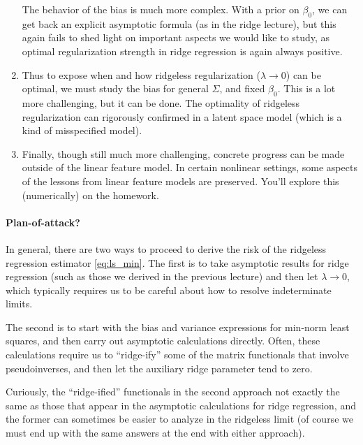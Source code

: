 \documentclass{article}
\begin{document}
\begin{enumerate}
The behavior of the bias is much more complex. With a prior on $\beta_0$, we can 
get back an explicit asymptotic formula (as in the ridge lecture), but this
again fails to shed light on important aspects we would like to study, as
optimal regularization strength in ridge regression is again always positive.     

\item
Thus to expose when and how ridgeless regularization ($\lambda \to 0$) can be
optimal, we must study the bias for general $\Sigma$, and fixed $\beta_0$. This
is a lot more challenging, but it can be done. The optimality of ridgeless 
regularization can rigorously confirmed in a latent space model (which is a kind
of misspecified model). 

\item
Finally, though still much more challenging, concrete progress can be made
outside of the linear feature model. In certain nonlinear settings, some aspects
of the lessons from linear feature models are preserved. You'll explore this 
(numerically) on the homework.  
\end{enumerate}

\paragraph{Plan-of-attack?}

In general, there are two ways to proceed to derive the risk of the ridgeless
regression estimator \eqref{eq:ls_min}. The first is to take asymptotic results
for ridge regression (such as those we derived in the previous lecture) and then
let $\lambda \to 0$, which typically requires us to be careful about how to
resolve indeterminate limits. 

The second is to start with the bias and variance expressions for min-norm 
least squares, and then carry out asymptotic calculations directly. Often, these
calculations require us to ``ridge-ify'' some of the matrix functionals
that involve pseudoinverses, and then let the auxiliary ridge parameter tend to
zero. 

Curiously, the ``ridge-ified'' functionals in the second approach not exactly
the same as those that appear in the asymptotic calculations for ridge
regression, and the former can sometimes be easier to analyze in the ridgeless
limit (of course we must end up with the same answers at the end with either
approach).  
\end{document}
